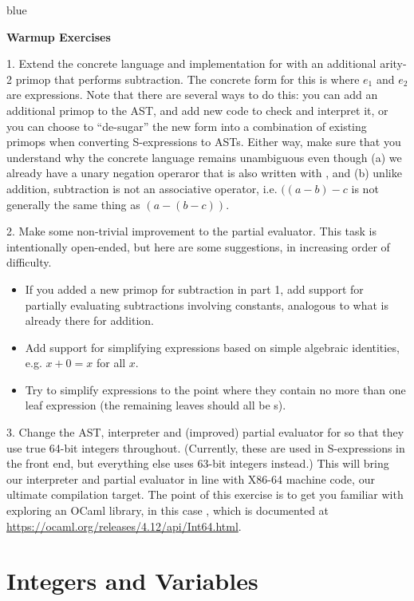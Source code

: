 \documentclass[11pt]{book}
\newenvironment{ocamlx}{
  \begin{color}{blue}
}
{
  \end{color}
}
\begin{document}
\begin{ocamlx}
{\bf Warmup Exercises}

1. Extend the concrete language and implementation for \LangInt{} with an additional arity-2 primop that
performs subtraction.  The concrete form for this is  where
$e_1$ and $e_2$ are expressions. Note that there are several ways to do this: you can add
an additional primop  to the AST, and add new code to check and interpret it,
or you can choose to ``de-sugar'' the new form into a combination of existing primops when
converting S-expressions to ASTs. Either way, make sure that you understand why the concrete
language remains unambiguous even though (a) we already have a unary negation operaror that is also written
with \code{-}, and (b) unlike addition, subtraction is not an associative operator, i.e.
$((a-b)-c$ is not generally the same thing as $(a-(b-c))$.

2. Make some non-trivial improvement to the partial evaluator. This task is intentionally open-ended, but here
are some suggestions, in increasing order of difficulty.
\begin{itemize}
\item 
If you added a new primop for subtraction in part 1, add support for
partially evaluating subtractions involving constants, analogous to what is already there
for addition.
\item
  Add support for simplifying expressions
  based on simple algebraic identities, e.g. $x + 0 = x$ for all $x$.
\item Try to simplify expressions to
  the point where they contain no more than one  leaf expression (the remaining leaves should all be
s). 
\end{itemize}

3. Change the AST, interpreter and (improved) partial evaluator for \LangInt{} so that they
use true 64-bit integers throughout.
(Currently, these are used in S-expressions in the front end, but everything else uses 63-bit integers instead.)
This will bring our interpreter and partial evaluator in line with X86-64 machine code, our ultimate
compilation target.
The point of this exercise is to get you familiar with exploring an OCaml library, in this case ,
which is documented at \url{https://ocaml.org/releases/4.12/api/Int64.html}.
\end{ocamlx}


\chapter{Integers and Variables}
\label{ch:Rvar}
\end{document}
